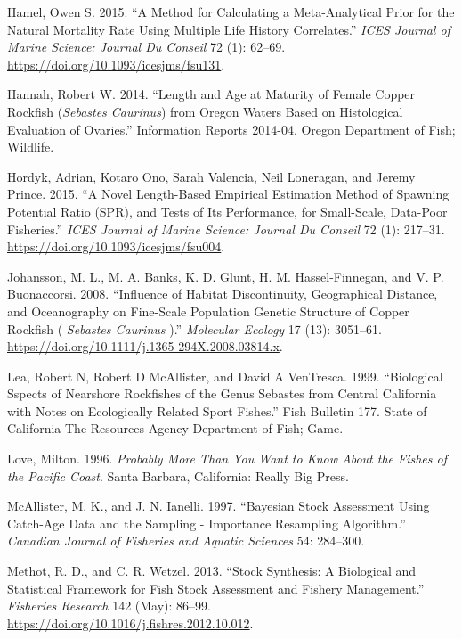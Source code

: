 \documentclass[11pt,
  english,
  a4paper,
]{article}
\begin{document}
\begin{cslreferences}
\leavevmode\hypertarget{ref-hamel_method_2015}{}%
Hamel, Owen S. 2015. ``A Method for Calculating a Meta-Analytical Prior for the Natural Mortality Rate Using Multiple Life History Correlates.'' \emph{ICES Journal of Marine Science: Journal Du Conseil} 72 (1): 62--69. \url{https://doi.org/10.1093/icesjms/fsu131}.

\leavevmode\hypertarget{ref-hannah_length_2014}{}%
Hannah, Robert W. 2014. ``Length and Age at Maturity of Female Copper Rockfish (\emph{Sebastes Caurinus}) from Oregon Waters Based on Histological Evaluation of Ovaries.'' Information Reports 2014-04. Oregon Department of Fish; Wildlife.

\leavevmode\hypertarget{ref-hordyk_novel_2015}{}%
Hordyk, Adrian, Kotaro Ono, Sarah Valencia, Neil Loneragan, and Jeremy Prince. 2015. ``A Novel Length-Based Empirical Estimation Method of Spawning Potential Ratio (SPR), and Tests of Its Performance, for Small-Scale, Data-Poor Fisheries.'' \emph{ICES Journal of Marine Science: Journal Du Conseil} 72 (1): 217--31. \url{https://doi.org/10.1093/icesjms/fsu004}.

\leavevmode\hypertarget{ref-johansson_influence_2008}{}%
Johansson, M. L., M. A. Banks, K. D. Glunt, H. M. Hassel-Finnegan, and V. P. Buonaccorsi. 2008. ``Influence of Habitat Discontinuity, Geographical Distance, and Oceanography on Fine-Scale Population Genetic Structure of Copper Rockfish ( \emph{Sebastes Caurinus} ).'' \emph{Molecular Ecology} 17 (13): 3051--61. \url{https://doi.org/10.1111/j.1365-294X.2008.03814.x}.

\leavevmode\hypertarget{ref-lea_biological_1999}{}%
Lea, Robert N, Robert D McAllister, and David A VenTresca. 1999. ``Biological Sspects of Nearshore Rockfishes of the Genus Sebastes from Central California with Notes on Ecologically Related Sport Fishes.'' Fish Bulletin 177. State of California The Resources Agency Department of Fish; Game.

\leavevmode\hypertarget{ref-love_milton_probably_1996}{}%
Love, Milton. 1996. \emph{Probably More Than You Want to Know About the Fishes of the Pacific Coast}. Santa Barbara, California: Really Big Press.

\leavevmode\hypertarget{ref-mcallister_bayesian_1997}{}%
McAllister, M. K., and J. N. Ianelli. 1997. ``Bayesian Stock Assessment Using Catch-Age Data and the Sampling - Importance Resampling Algorithm.'' \emph{Canadian Journal of Fisheries and Aquatic Sciences} 54: 284--300.

\leavevmode\hypertarget{ref-methot_stock_2013}{}%
Methot, R. D., and C. R. Wetzel. 2013. ``Stock Synthesis: A Biological and Statistical Framework for Fish Stock Assessment and Fishery Management.'' \emph{Fisheries Research} 142 (May): 86--99. \url{https://doi.org/10.1016/j.fishres.2012.10.012}.


\end{cslreferences}
\end{document}
